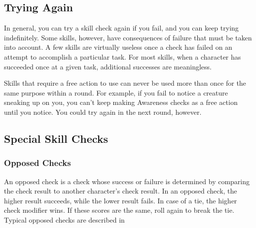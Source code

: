     \subsection{Trying Again}
        In general, you can try a skill check again if you fail, and you can keep trying indefinitely. Some skills, however, have consequences of failure that must be taken into account. A few skills are virtually useless once a check has failed on an attempt to accomplish a particular task. For most skills, when a character has succeeded once at a given task, additional successes are meaningless.

        Skills that require a free action to use can never be used more than once for the same purpose within a round. For example, if you fail to notice a creature sneaking up on you, you can't keep making Awareness checks as a free action until you notice. You could try again in the next round, however.

    \subsection{Special Skill Checks}

        \subsubsection{Opposed Checks}
            An opposed check is a check whose success or failure is determined by comparing the check result to another character's check result. In an opposed check, the higher result succeeds, while the lower result fails. In case of a tie, the higher check modifier wins. If these scores are the same, roll again to break the tie. Typical opposed checks are described in 


